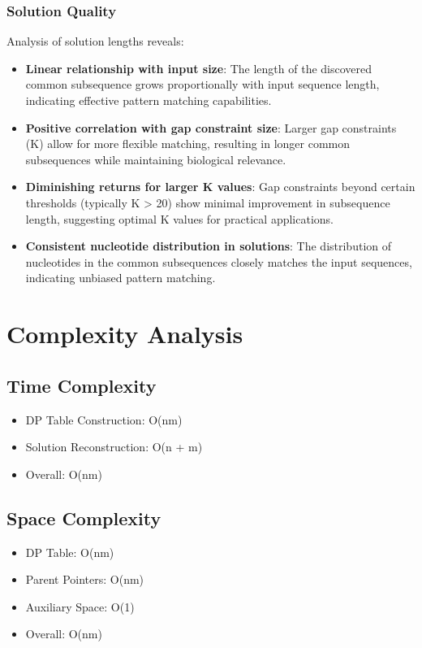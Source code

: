 \documentclass[12pt]{article}
\begin{document}
\subsubsection{Solution Quality}
Analysis of solution lengths reveals:
\begin{itemize}
    \item \textbf{Linear relationship with input size}: The length of the discovered common subsequence grows proportionally with input sequence length, indicating effective pattern matching capabilities.
    \item \textbf{Positive correlation with gap constraint size}: Larger gap constraints (K) allow for more flexible matching, resulting in longer common subsequences while maintaining biological relevance.
    \item \textbf{Diminishing returns for larger K values}: Gap constraints beyond certain thresholds (typically K > 20) show minimal improvement in subsequence length, suggesting optimal K values for practical applications.
    \item \textbf{Consistent nucleotide distribution in solutions}: The distribution of nucleotides in the common subsequences closely matches the input sequences, indicating unbiased pattern matching.
\end{itemize}

\section{Complexity Analysis}

\subsection{Time Complexity}
\begin{itemize}
    \item DP Table Construction: O(nm)
    \item Solution Reconstruction: O(n + m)
    \item Overall: O(nm)
\end{itemize}

\subsection{Space Complexity}
\begin{itemize}
    \item DP Table: O(nm)
    \item Parent Pointers: O(nm)
    \item Auxiliary Space: O(1)
    \item Overall: O(nm)
\end{itemize}
\end{document}
